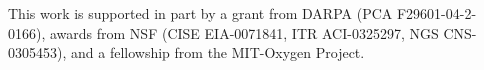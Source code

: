 \documentclass{csailabstractbook}
\begin{document}
This work is supported in part by a grant from DARPA (PCA
F29601-04-2-0166), awards from NSF (CISE EIA-0071841, ITR ACI-0325297,
NGS CNS-0305453), and a fellowship from the MIT-Oxygen Project.


\end{document}

